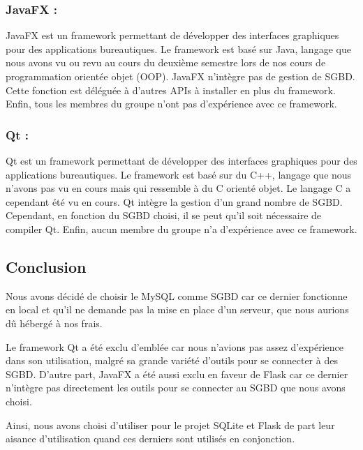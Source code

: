 \subsubsection{JavaFX :}

JavaFX est un framework permettant de développer des interfaces graphiques pour des applications bureautiques.
Le framework est basé sur Java, langage que nous avons vu ou revu au cours du deuxième semestre lors de nos cours de programmation orientée objet (OOP).
JavaFX n’intègre pas de gestion de SGBD. Cette fonction est déléguée à d'autres APIs à installer en plus du framework.
Enfin, tous les membres du groupe n'ont pas d’expérience avec ce framework.
\cite{JavaFX-wiki}

\subsubsection{Qt :}

Qt est un framework permettant de développer des interfaces graphiques pour des applications bureautiques.
Le framework est basé sur du C++, langage que nous n’avons pas vu en cours mais qui ressemble à du C orienté objet. Le langage C a cependant été vu en cours.
Qt intègre la gestion d’un grand nombre de SGBD. Cependant, en fonction du SGBD choisi, il se peut qu'il soit nécessaire de compiler Qt.
Enfin, aucun membre du groupe n'a d’expérience avec ce framework.
\cite{Qt}

\subsection{Conclusion}

Nous avons décidé de choisir le MySQL comme SGBD car ce dernier fonctionne en local et qu’il ne demande pas la mise en place d’un serveur, que nous aurions dû hébergé à nos frais.

Le framework Qt a été exclu d’emblée car nous n’avions pas assez d’expérience dans son utilisation, malgré sa grande variété d’outils pour se connecter à des SGBD.
D’autre part, JavaFX a été aussi exclu en faveur de Flask car ce dernier n'intègre pas directement les outils pour se connecter au SGBD que nous avons choisi.

Ainsi, nous avons choisi d’utiliser pour le projet SQLite et Flask de part leur aisance d’utilisation quand ces derniers sont utilisés en conjonction.

